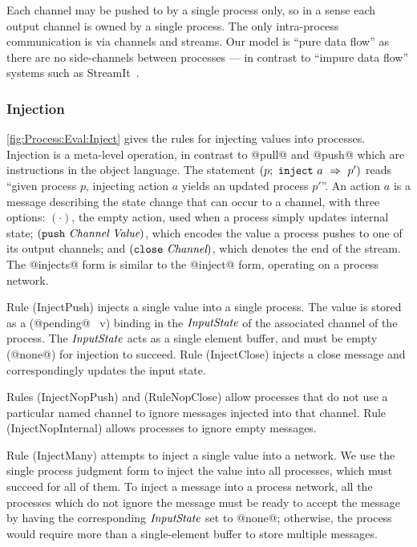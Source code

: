 Each channel may be pushed to by a single process only, so in a sense each output channel is owned by a single process.
The only intra-process communication is via channels and streams.
Our model is ``pure data flow'' as there are no side-channels between processes --- in contrast to ``impure data flow'' systems such as StreamIt~\cite{thies2002streamit}.



\subsubsection{Injection}
\autoref{fig:Process:Eval:Inject} gives the rules for injecting values into processes.
Injection is a meta-level operation, in contrast to @pull@ and @push@ which are instructions in the object language.
The statement $(p;~\texttt{inject}~a~\Rightarrow~p')$ reads ``given process $p$, injecting action $a$ yields an updated process $p'$''.
An action $a$ is a message describing the state change that can occur to a channel, with three options: $(\cdot)$, the empty action, used when a process simply updates internal state; $(\texttt{push}~\textit{Channel}~\textit{Value})$, which encodes the value a process pushes to one of its output channels; and $(\texttt{close}~\textit{Channel})$, which denotes the end of the stream.
The @injects@ form is similar to the @inject@ form, operating on a process network.

Rule (InjectPush) injects a single value into a single process. The value is stored as a (@pending@~ v) binding in the $\textit{InputState}$ of the associated channel of the process. The $\textit{InputState}$ acts as a single element buffer, and must be empty (@none@) for injection to succeed.
Rule (InjectClose) injects a close message and correspondingly updates the input state.

Rules (InjectNopPush) and (RuleNopClose) allow processes that do not use a particular named channel to ignore messages injected into that channel.
Rule (InjectNopInternal) allows processes to ignore empty messages.

Rule (InjectMany) attempts to inject a single value into a network.
We use the single process judgment form to inject the value into all processes, which must succeed for all of them.
To inject a message into a process network, all the processes which do not ignore the message must be ready to accept the message by having the corresponding $\textit{InputState}$ set to @none@; otherwise, the process would require more than a single-element buffer to store multiple messages.


